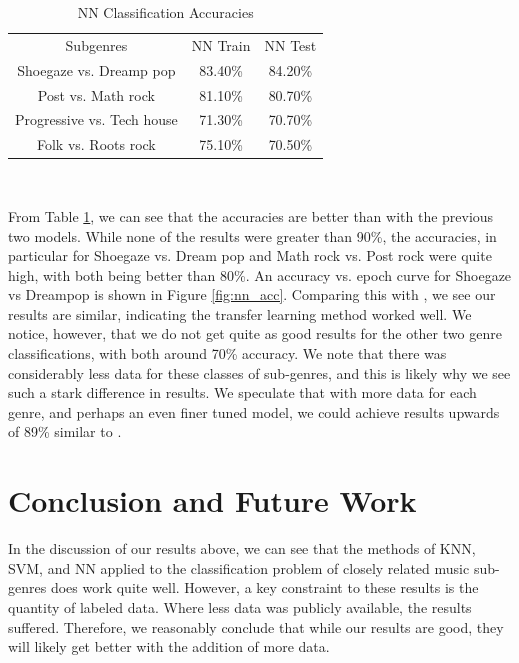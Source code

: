 \documentclass[letterpaper, 12 pt, conference]{ieeeconf}  %
\begin{document}
\begin{table}[!hb]
\begin{center}
    \caption{NN Classification Accuracies}{\label{tab:nn_acc}}
    \begin{tabular}{ |c|c|c| }
 Subgenres & NN Train & NN Test \\ 
 Shoegaze vs. Dreamp pop &  83.40\% & 84.20\% \\
 Post vs. Math rock & 81.10\% & 80.70\% \\
 Progressive vs. Tech house & 71.30\% & 70.70\% \\
 Folk vs. Roots rock & 75.10\% & 70.50\% \\
\end{tabular}\\
\end{center}
\end{table}


\par From Table \ref{tab:nn_acc}, we can see that the accuracies are better than with the previous two models. While none of the results were greater than 90\%, the accuracies, in particular for Shoegaze vs. Dream pop and Math rock vs. Post rock were quite high, with both being better than 80\%. An accuracy vs. epoch curve for Shoegaze vs Dreampop is shown in Figure \ref{fig:nn_acc}. Comparing this with \cite{c7}, we see our results are similar, indicating the transfer learning method worked well. We notice, however, that we do not get quite as good results for the other two genre classifications, with both around 70\% accuracy. We note that there was considerably less data for these classes of sub-genres, and this is likely why we see such a stark difference in results. We speculate that with more data for each genre, and perhaps an even finer tuned model, we could achieve results upwards of 89\% similar to \cite{c7}.







\section{Conclusion and Future Work}

In the discussion of our results above, we can see that the methods of KNN, SVM, and NN applied to the classification problem of closely related music sub-genres does work quite well. However, a key constraint to these results is the quantity of labeled data. Where less data was publicly available, the results suffered. Therefore, we reasonably conclude that while our results are good, they will likely get better with the addition of more data.   
\end{document}
